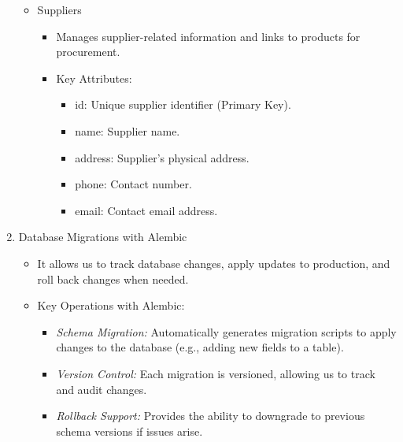 \documentclass{llncs}
\begin{document}
\begin{enumerate}
\begin{itemize}
\begin{itemize}
\begin{itemize}
                              \end{itemize}
                    \end{itemize}
              \item Suppliers
                    \begin{itemize}
                        \item Manages supplier-related information and links to products for procurement.
                        \item Key Attributes:
                              \begin{itemize}
                                  \item id: Unique supplier identifier (Primary Key).
                                  \item name: Supplier name.
                                  \item address: Supplier’s physical address.
                                  \item phone: Contact number.
                                  \item email: Contact email address.

                              \end{itemize}
                    \end{itemize}
          \end{itemize}
    \item  Database Migrations with Alembic
          \begin{itemize}
              \item It allows us to track database changes, apply updates to production, and roll back changes when needed.
              \item Key Operations with Alembic:
                    \begin{itemize}
                        \item \textit{Schema Migration:} Automatically generates migration scripts to apply changes to the database (e.g., adding new fields to a table).
                        \item \textit{Version Control:} Each migration is versioned, allowing us to track and audit changes.
                        \item \textit{Rollback Support:} Provides the ability to downgrade to previous schema versions if issues arise.
                    \end{itemize}
          \end{itemize}
\end{enumerate}
\end{document}
